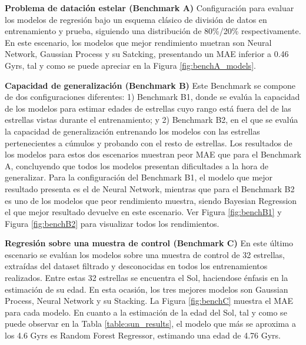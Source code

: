 \vspace{0.25cm}
\textbf{Problema de datación estelar (Benchmark A)} {} Configuración para evaluar los modelos de regresión bajo un esquema clásico de división de datos en entrenamiento y prueba, siguiendo una distribución de 80\%/20\% respectivamente. En este escenario, los modelos que mejor rendimiento muetran son Neural Network, Gaussian Process y su Satcking, presentando un MAE inferior a 0.46 Gyrs, tal y como se puede apreciar en la Figura \ref{fig:benchA_models}.

\vspace{0.25cm}

\textbf{Capacidad de generalización (Benchmark B)} {} Este Benchmark se compone de dos configuraciones diferentes: 1) Benchmark B1, donde se evalúa la capacidad de los modelos para estimar edades de estrellas cuyo rango está fuera del de las estrellas vistas durante el entrenamiento; y 2) Benchmark B2, en el que se evalúa la capacidad de generalización entrenando los modelos con las estrellas pertenecientes a cúmulos y probando con el resto de estrellas. Los resultados de los modelos para estos dos escenarios muestran peor MAE que para el Benchmark A, concluyendo que todos los modelos presentan dificultades a la hora de generalizar. Para la configuración del Benchmark B1, el modelo que mejor resultado presenta es el de Neural Network, mientras que para el Benchmark B2 es uno de los modelos que peor rendimiento muestra, siendo Bayesian Regression el que mejor resultado devuelve en este escenario. Ver Figura \ref{fig:benchB1} y Figura \ref{fig:benchB2} para visualizar todos los rendimientos.
\vspace{0.25cm}

\textbf{Regresión sobre una muestra de control (Benchmark C)} {} En este último escenario se evalúan los modelos sobre una muestra de control de 32 estrellas, extraídas del dataset filtrado y desconocidas en todos los entrenamientos realizados. Entre estas 32 estrellas se encuentra el Sol, haciendose énfasis en la estimación de su edad. En esta ocasión, los tres mejores modelos son Gaussian Process, Neural Network y su Stacking. La Figura \ref{fig:benchC} muestra el MAE para cada modelo. En cuanto a la estimación de la edad del Sol, tal y como se puede observar en la Tabla \ref{table:sun_results}, el modelo que más se aproxima a los 4.6 Gyrs es Random Forest Regressor, estimando una edad de 4.76 Gyrs.

